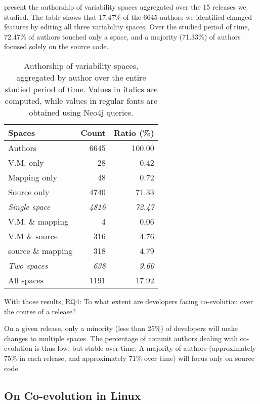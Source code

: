  present the authorship of variability spaces aggregated over the 15 releases we studied.
The table shows that 17.47\% of the 6645 authors we identified changed features by editing all three variability spaces.
Over the studied period of time, 72.47\% of authors touched only a space, and a majority (71.33\%) of authors focused solely on the source code.

\begin{table}[h]
\centering
\begin{adjustbox}{max width=\textwidth}
\centering
\begin{tabular}{|l|r|r|}
\hline
Spaces	 			 & Count & Ratio (\%)\\
\hline
Authors 					& 6645	& 100.00 \\
\hline
V.M. only				&28		&0.42	\\
Mapping only 			&48		&0.72	\\
Source only 				&4740	&71.33	\\

\emph{Single space}		&\emph{4816}	& \emph{72.47}	\\
\hline
V.M. \& mapping 			&4		&0,06		\\
V.M \&  source			&316		&4.76		\\
source \& mapping		&318		&4.79		\\
\emph{Two spaces}		&\emph{638}	&\emph{9.60}	\\
\hline
All spaces 				&1191		& 17.92\\
\hline
\end{tabular}
\end{adjustbox}
\caption{Authorship of variability spaces, aggregated by author over the entire studied period of time. Values in italics are computed, while values in regular fonts are obtained using Neo4j queries.}
\label{feature_authorship_aggregated}
\end{table}

With those results, RQ4: To what extent are developers facing co-evolution over the course of a release?
\begin{framed}
On a given release, only a minority (less than 25\%) of developers will make changes to multiple spaces.
The percentage of commit authors dealing with co-evolution is thus low, but stable over time.
A majority of authors (approximately 75\% in each release, and approximately 71\% over time) will focus only on source code.
\end{framed}


\subsection{On Co-evolution in Linux}

